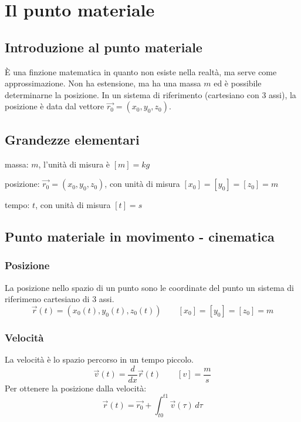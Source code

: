 \documentclass[a4paper]{article}
\begin{document}
\section{Il punto materiale}
\subsection{Introduzione al punto materiale}
È una finzione matematica in quanto non esiste nella realtà, ma serve come approssimazione. Non ha estensione, ma ha una massa
\(m\) ed è possibile determinarne la posizione. In un sistema di riferimento (cartesiano con 3 assi), la posizione è data dal
vettore \(\vec{r_0} = \left(x_0, y_0, z_0\right)\).

\subsection{Grandezze elementari}

massa: \(m\), l'unità di misura è \(\left[m\right] = kg\)

posizione: \(\vec{r_0} = \left(x_0, y_0, z_0\right)\), con unità di misura \(\left[x_0\right] = \left[y_0\right] = \left[z_0\right] = m\)

tempo: \(t\), con unità di misura \(\left[t\right] = s\)

\newpage


\subsection{Punto materiale in movimento - cinematica}
\subsubsection*{Posizione}
La posizione nello spazio di un punto sono le coordinate del punto un sistema di riferimeno cartesiano di 3 assi.
\[\vec{r}(t) = \left(x_0(t), y_0(t), z_0(t)\right) \qquad \left[x_0\right] = \left[y_0\right] = \left[z_0\right] = m\]

\subsubsection*{Velocità}
La velocità è lo spazio percorso in un tempo piccolo. \[\vec{v}(t) = \frac{d}{dx} \vec{r}(t) \qquad \left[v\right] = \frac{m}{s}\]
Per ottenere la posizione dalla velocità: \[\vec{r}(t) = \vec{r_0} + \int_{t0}^{t1} \vec{v}(\tau) \, d\tau\]
\end{document}

